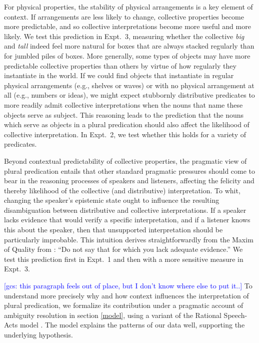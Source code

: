 \documentclass[linguex]{sp}
\newcommand{\ndg}[1]{\textcolor{Green}{[ndg: #1]}}
\newcommand{\gcs}[1]{\textcolor{blue}{[gcs: #1]}}
\begin{document}
For physical properties, the stability of physical arrangements is a key element of context. If arrangements are less likely to change, collective properties become more predictable, and so collective interpretations become more useful and more likely. 
We test this prediction in Expt.~3, measuring whether the collective \emph{big} and \emph{tall} indeed feel more natural for boxes that are always stacked regularly than for jumbled piles of boxes.
More generally, some types of objects may have more predictable collective properties than others by virtue of how regularly they instantiate in the world.  If we could find objects that instantiate in regular physical arrangements (e.g., shelves or waves) or with no physical arrangement at all (e.g., numbers or ideas), we might expect stubbornly distributive predicates to more readily admit collective interpretations when the nouns that name these objects serve as subject.
This reasoning leads to the prediction that the nouns which serve as objects in a plural predication should also affect the likelihood of collective interpretation. %
In Expt.~2, we test whether this holds for a variety of predicates.

Beyond contextual predictability of collective properties, the pragmatic view of plural predication entails that other standard pragmatic pressures should come to bear in the reasoning processes of speakers and listeners, affecting the felicity and thereby likelihood of the collective (and distributive) interpretation.
To whit, changing the speaker's epistemic state ought to influence the resulting disambiguation between distributive and collective interpretations. 
If a speaker lacks evidence that would verify a specific interpretation, and if a listener knows this about the speaker, then that unsupported interpretation should be particularly improbable. This intuition derives straightforwardly from the Maxim of Quality from \cite{grice1975}: ``Do not say that for which you lack adequate evidence.'' 
We test this prediction first in Expt.~1 and then with a more sensitive measure in Expt.~3.

\gcs{this paragraph feels out of place, but I don't know where else to put it..}
To understand more precisely why and how context  influences the interpretation of plural predication, we formalize its contribution under a pragmatic account of ambiguity resolution in section \ref{model}, using a variant of the Rational Speech-Acts model \citep[e.g.,][]{frankgoodman2012,lassitergoodman2013}. The model explains the patterns of our data well, supporting the underlying hypothesis.
\end{document}
